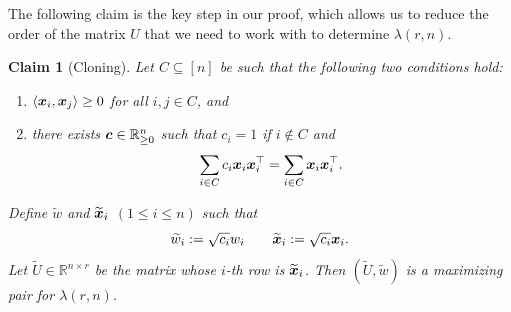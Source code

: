 \documentclass[11pt]{article}
\theoremstyle{plain}
\newtheorem{claim}{Claim}[section]
\numberwithin{equation}{section}
\def\cvec{\mbox{\boldmath $c$}}
\def\x{\mbox{\boldmath $x$}}
\newcommand{\ip}[2]{\langle #1, #2 \rangle}
\begin{document}
The following claim is the key step in our proof, which allows us to reduce the order of the matrix $U$ that we need to work with to determine $\lambda(r,n)$.

\begin{claim}[Cloning]\label{claim:cloning} Let $C\subseteq [n]$ be such that the following two conditions hold:
\begin{enumerate}[$(i)$]
    \item $\ip{\x_i}{\x_j}\ge 0$ for all $i,j\in C$, and
    \item there exists $\cvec\in \mathbb{R}^n_{\ge 0}$ such that $c_i = 1$ if $i\notin C$ and
    \[\sum_{i\in C}c_i \x_i\x_i^\top = \sum_{i\in C}\x_i\x_i^\top.\]
    \end{enumerate}
    Define $\widetilde{w}$ and $\widetilde{\x}_i$ $(1\le i\le n)$ such that 
    \[ \widetilde{w}_i := \sqrt{c_i}w_i \qquad 
    \widetilde{\x}_i := \sqrt{c_i}\x_i.
    \]
Let $\widetilde{U}\in \mathbb{R}^{n\times r}$ be the matrix whose $i$-th row is $\widetilde{\x}_i$. Then $(\widetilde{U}, \widetilde{w})$ is a maximizing pair for $\lambda(r, n)$.
\end{claim}
\end{document}

